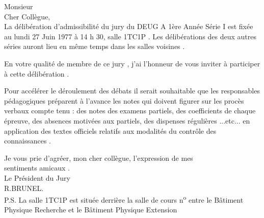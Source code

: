 Monsieur \\

Cher Collègue,\\

La délibération d'admissibilité du jury du DEUG A 1ère Année Série I est fixée au lundi 27 Juin 1977 à 14 h 30, salle 1TC1P . Les délibérations des deux autres séries auront lieu en même temps dans les salles voisines .

En votre qualité de membre de ce jury , j'ai l'honneur de vous inviter à participer à cette délibération .

Pour accélérer le déroulement des débats il serait souhaitable que les responsables pédagogiques préparent à l'avance les notes qui doivent figurer sur les procès verbaux compte tenu : des notes des examens partiels, des coefficients de chaque épreuve, des absences motivées aux partiels, des dispenses régulières ...etc... en application des textes officiels relatifs aux modalités du contrôle des connaissances .

Je vous prie d'agréer, mon cher collègue, l'expression de mes\\
sentiments amicaux .\\

Le Président du Jury\\
R.BRUNEL.\qquad{}\\

P.S. La salle 1TC1P est située derrière la salle de cours n\textsuperscript{o}  entre le Bâtiment Physique Recherche et le Bâtiment Physique Extension
